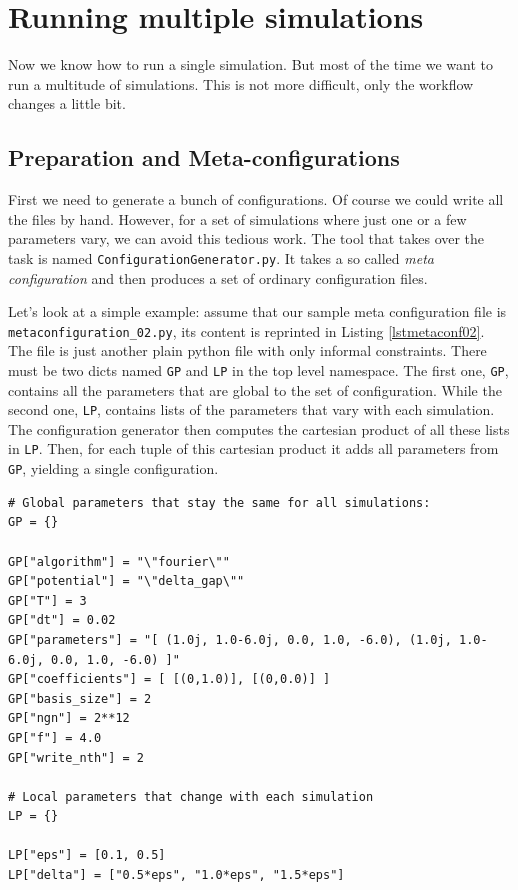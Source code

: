 \documentclass[a4paper,10pt]{report}
\begin{document}
\section{Running multiple simulations}

Now we know how to run a single simulation. But most of the time we want to run
a multitude of simulations. This is not more difficult, only the workflow changes
a little bit.

\subsection{Preparation and Meta-configurations}

First we need to generate a bunch of configurations. Of course we could write all
the files by hand. However, for a set of simulations where just one or a few
parameters vary, we can avoid this tedious work. The tool that takes over the
task is named \texttt{ConfigurationGenerator.py}. It takes a so called \emph{meta configuration}
and then produces a set of ordinary configuration files.

Let's look at a simple example: assume that our sample meta configuration file is \texttt{metaconfiguration\_02.py},
its content is reprinted in Listing \ref{lstmetaconf02}. The file is just another
plain python file with only informal constraints. There must be two dicts named
\texttt{GP} and \texttt{LP} in the top level namespace. The first one, \texttt{GP},
contains all the parameters that are global to the set of configuration. While the second
one, \texttt{LP}, contains lists of the parameters that vary with each simulation.
The configuration generator then computes the cartesian product of all these
lists in \texttt{LP}. Then, for each tuple of this cartesian product it adds all
parameters from \texttt{GP}, yielding a single configuration.

\begin{lstlisting}[float=tp,frame=single,label=lstmetaconf02,caption={Sample meta configuration \texttt{metaconfiguration\_02.py}}]
# Global parameters that stay the same for all simulations:
GP = {}

GP["algorithm"] = "\"fourier\""
GP["potential"] = "\"delta_gap\""
GP["T"] = 3
GP["dt"] = 0.02
GP["parameters"] = "[ (1.0j, 1.0-6.0j, 0.0, 1.0, -6.0), (1.0j, 1.0-6.0j, 0.0, 1.0, -6.0) ]"
GP["coefficients"] = [ [(0,1.0)], [(0,0.0)] ]
GP["basis_size"] = 2
GP["ngn"] = 2**12
GP["f"] = 4.0
GP["write_nth"] = 2

# Local parameters that change with each simulation
LP = {}

LP["eps"] = [0.1, 0.5]
LP["delta"] = ["0.5*eps", "1.0*eps", "1.5*eps"]
\end{lstlisting}
\end{document}
